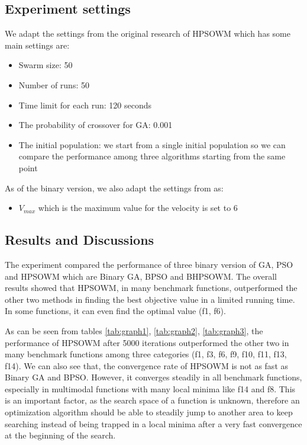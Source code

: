 \subsection{Experiment settings}
We adapt the settings from the original research of HPSOWM \cite{ling2008hybrid} which has some main settings are:
\begin{itemize}
	\item Swarm size: 50
	\item Number of runs: 50
	\item Time limit for each run: 120 seconds
	\item The probability of crossover for GA: 0.001
	\item The initial population: we start from a single initial population so we can compare the performance among three algorithms starting from the same point
\end{itemize}
As of the binary version, we also adapt the settings from \cite{kennedy1997discrete} as:
\begin{itemize}
	\item $V_{max}$ which is the maximum value for the velocity is set to 6
\end{itemize}

\subsection{Results and Discussions}

The experiment compared the performance of three binary version of GA, PSO and HPSOWM which are Binary GA, BPSO and BHPSOWM. The overall results showed that HPSOWM, in many benchmark functions, outperformed the other two methods in finding the best objective value in a limited running time. In some functions, it can even find the optimal value (f1, f6).

As can be seen from tables \ref{tab:graph1}, \ref{tab:graph2}, \ref{tab:graph3}, the performance of HPSOWM after 5000 iterations outperformed the other two in many benchmark functions among three categories (f1, f3, f6, f9, f10, f11, f13, f14). We can also see that, the convergence rate of HPSOWM is not as fast as Binary GA and BPSO. However, it converges steadily in all benchmark functions, especially in multimodal functions with many local minima like f14 and f8. This is an important factor, as the search space of a function is unknown, therefore an optimization algorithm should be able to steadily jump to another area to keep searching instead of being trapped in a local minima after a very fast convergence at the beginning of the search.

